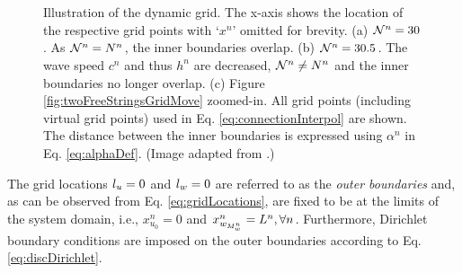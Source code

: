 \documentclass[fleqn]{jaes}
\begin{document}
\begin{figure}[t]
    \centering
    \\
    \vspace{-1em}\\
    \vspace{-1em}
    \vspace{-1em}\caption{Illustration of the dynamic grid. The x-axis shows the location of the respective grid points with `$x^n$' omitted for brevity. 
    (a) $\mathcal{N}^n = 30$. As $\mathcal{N}^n = N^n$, the inner boundaries overlap. (b) $\mathcal{N}^n = 30.5$. The wave speed $c^n$ and thus $h^n$ are decreased, $\mathcal{N}^n \neq N^n$ and the inner boundaries no longer overlap. (c) Figure \ref{fig:twoFreeStringsGridMove} zoomed-in. All grid points (including virtual grid points) used in Eq. \eqref{eq:connectionInterpol} are shown. The distance between the inner boundaries is expressed using $\alpha^n$ in Eq. \eqref{eq:alphaDef}. (Image adapted from \cite{Willemsen2021a}.)}
\end{figure}
The grid locations ${l_u} = 0$ and ${l_w} = 0$ are referred to as the \textit{outer boundaries} and, as can be observed from Eq. \eqref{eq:gridLocations}, are fixed to be at the limits of the system domain, i.e., $x_{u_0}^n = 0$ and $x_{w_{M_w^n}}^n = L^n, \forall n$. Furthermore, Dirichlet boundary conditions are imposed on the outer boundaries according to Eq. \eqref{eq:discDirichlet}. 
\end{document}

